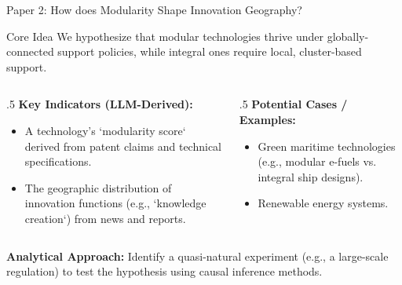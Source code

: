 \documentclass[10pt, aspectratio=169]{beamer}
\begin{document}
\begin{frame}{Paper 2: How does Modularity Shape Innovation Geography?}
    \begin{block}{Core Idea}
        \alert{We hypothesize that modular technologies thrive under globally-connected support policies, while integral ones require local, cluster-based support.}
    \end{block}
    
    \vfill
    
    \begin{columns}[T]
        \begin{column}{.5\textwidth}
            \textbf{Key Indicators (LLM-Derived):}
            \begin{itemize}
                \item A technology's `modularity score` derived from patent claims and technical specifications.
                \item The geographic distribution of innovation functions (e.g., `knowledge creation`) from news and reports.
            \end{itemize}
        \end{column}
        \begin{column}{.5\textwidth}
            \textbf{Potential Cases / Examples:}
            \begin{itemize}
                \item Green maritime technologies (e.g., modular e-fuels vs. integral ship designs).
                \item Renewable energy systems.
            \end{itemize}
        \end{column}
    \end{columns}

    \vfill
    \textbf{\textcolor{aauDarkGreen}{Analytical Approach:}} Identify a quasi-natural experiment (e.g., a large-scale regulation) to test the hypothesis using causal inference methods.
\end{frame}
\end{document}
